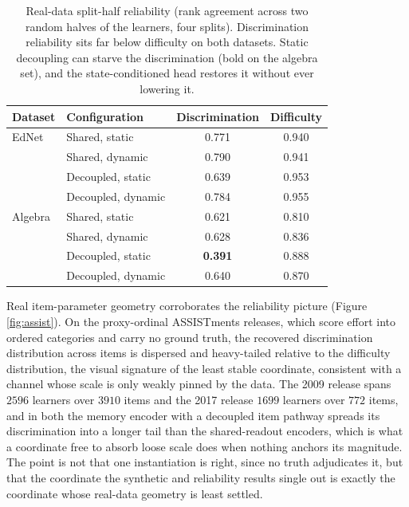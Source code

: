 \documentclass[sigconf,nonacm,screen]{acmart}
\begin{document}
\begin{table}[t]
\caption{Real-data split-half reliability (rank agreement across two random halves
of the learners, four splits). Discrimination reliability sits far below difficulty
on both datasets. Static decoupling can starve the discrimination (bold on the
algebra set), and the state-conditioned head restores it without ever lowering it.}
\label{tab:real}
\small
\begin{tabular}{@{}llcc@{}}
\toprule
Dataset & Configuration & Discrimination & Difficulty \\
\midrule
EdNet   & Shared, static     & 0.771 & 0.940 \\
        & Shared, dynamic    & 0.790 & 0.941 \\
        & Decoupled, static  & 0.639 & 0.953 \\
        & Decoupled, dynamic & 0.784 & 0.955 \\
\midrule
Algebra & Shared, static     & 0.621 & 0.810 \\
        & Shared, dynamic    & 0.628 & 0.836 \\
        & Decoupled, static  & \textbf{0.391} & 0.888 \\
        & Decoupled, dynamic & 0.640 & 0.870 \\
\bottomrule
\end{tabular}
\end{table}

Real item-parameter geometry corroborates the reliability picture (Figure
\ref{fig:assist}). On the proxy-ordinal ASSISTments releases, which score effort
into ordered categories and carry no ground truth, the recovered discrimination
distribution across items is dispersed and heavy-tailed relative to the difficulty
distribution, the visual signature of the least stable coordinate, consistent with a
channel whose scale is only weakly pinned by the data. The 2009 release spans $2596$
learners over $3910$ items and the 2017 release $1699$ learners over $772$ items, and
in both the memory encoder with a decoupled item pathway spreads its discrimination
into a longer tail than the shared-readout encoders, which is what a coordinate free
to absorb loose scale does when nothing anchors its magnitude. The point is not that
one instantiation is right, since no truth adjudicates it, but that the coordinate
the synthetic and reliability results single out is exactly the coordinate whose
real-data geometry is least settled.
\end{document}
